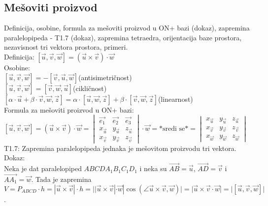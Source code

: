 \documentclass[12pt]{article}
\newcommand{\vek}[1]{\overrightarrow{#1}}
\begin{document}
\subsection{Mešoviti proizvod}
Definicija, osobine, formula za mešoviti proizvod u ON+
bazi (dokaz), zapremina paralelopipeda - T1.7 (dokaz),
zapremina tetraedra, orijentacija baze prostora, nezavisnost
tri vektora prostora, primeri.\\[1cm]
Definicija: $[\vek{u},\vek{v},\vek{w}]=(\vek{u}\times\vek{v})\cdot\vek{w}$\\
Osobine:\\
$[\vek{u},\vek{v},\vek{w}]=-[\vek{v},\vek{u},\vek{w}]$\hspace*{1cm}(antisimetričnost)\\
$[\vek{u},\vek{v},\vek{w}]=[\vek{v},\vek{w},\vek{u}]$\hspace*{1cm}(cikličnost)\\
$[\alpha\cdot\vek{u}+\beta\cdot\vek{v},\vek{w},\vek{z}]=\alpha\cdot[\vek{u},\vek{w},\vek{z}]+\beta\cdot[\vek{v},\vek{w},\vek{z}]$\hspace*{1cm}(linearnost)\\
Formula za mešoviti proizvod u ON+ bazi:\\
$[\vek{u},\vek{v},\vek{w}]=(\vek{u}\times\vek{v})\cdot\vek{w}= \begin{vmatrix}
        \vek{e_1}   & \vek{e_2}   & \vek{e_3}   \\
        x_{\vek{u}} & y_{\vek{u}} & z_{\vek{u}} \\
        x_{\vek{v}} & y_{\vek{v}} & z_{\vek{v}}
    \end{vmatrix}\cdot\vek{w}=\text{*sredi se*}= \begin{vmatrix}
        x_{\vek{u}} & y_{\vek{u}} & z_{\vek{u}} \\
        x_{\vek{v}} & y_{\vek{v}} & z_{\vek{v}} \\
        x_{\vek{w}} & y_{\vek{w}} & z_{\vek{w}}
    \end{vmatrix}$\\[0.3cm]
T1.7: Zapremina paralelopipeda jednaka je mešovitom proizvodu tri vektora.\\
Dokaz:\\
Neka je dat paralelopiped $ABCDA_1B_1C_1D_1$ i neka su $\vek{AB}=\vek{u}$, $\vek{AD}=\vek{v}$ i $\vek{AA_1}=\vek{w}$.
Tada je zapremina $V=P_{ABCD}\cdot h=|\vek{u}\times\vek{v}|\cdot h=||\vek{u}\times\vek{v}|\cdot \vek{w}|\cos(\angle \vek{u}\times\vek{v},\vek{w})|=|\vek{u}\times\vek{v}\cdot \vek{w}|=|[\vek{u},\vek{v},\vek{w}]|$.\\
\end{document}

